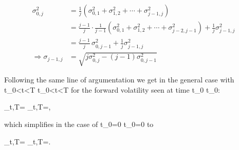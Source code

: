 {} \begin{align}
\sigma_{0,j}^2
&= \frac{1}{j}(\sigma_{0,1}^2 + \sigma_{1,2}^2 + \cdots  + \sigma_{j-1,j}^2)\\
&= \frac{j-1}{j}\cdot\frac{1}{j-1}(\sigma_{0,1}^2 + \sigma_{1,2}^2 + \cdots  + \sigma_{j-2,j-1}^2) + \frac{1}{j}\sigma_{j-1,j}^2\\
&= \frac{j-1}{j}\,\sigma_{0,j-1}^2 + \frac{1}{j}\sigma_{j-1,j}^2 \\
\Rightarrow \sigma_{j-1,j}
&=\sqrt{j\sigma_{0,j}^2-(j-1)\sigma_{0,j-1}^2}
\end{align}

Following the same line of argumentation we get in the general case with {\displaystyle t_{0}<t<T} t_0<t<T for the forward volatility seen at time {\displaystyle t_{0}} t_{0}:

{\displaystyle \sigma _{t,T}={}} \sigma_{t,T}=,

which simplifies in the case of {\displaystyle t_{0}=0} t_{0}=0 to

{\displaystyle \sigma _{t,T}={}} \sigma_{t,T}=.
